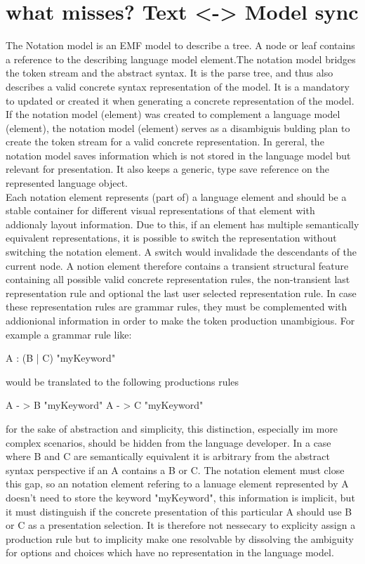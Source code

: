 \section{what misses? Text <-> Model sync}

The Notation model is an EMF model to describe a tree. A node or leaf contains a reference to the describing language model element.The notation model bridges the token stream and the abstract syntax. It is the parse tree, and thus also describes a valid concrete syntax representation of the model.  It is a mandatory to updated or created it when generating a concrete representation of the model. If the notation model (element) was created to complement a language model (element), the notation model (element) serves as a disambiguis bulding plan to create the token stream for a valid concrete representation. In gereral, the notation model saves information which is not stored in the language model but relevant for presentation. It also keeps a generic, type save reference on the represented language object.\\
Each notation element represents (part of) a language element and should be a stable container for different visual representations of that element with addionaly layout information.  Due to this, if an element has multiple semantically equivalent representations, it is possible to switch the representation without switching the notation element. A switch would invalidade the descendants of the current node. A notion element therefore contains a transient structural feature containing all possible valid concrete representation rules, the non-transient last representation rule and optional the last user selected representation rule. In case these representation rules are grammar rules, they must be complemented with addionional information in order to make the token production unambigious. For example a grammar rule like:
\begin{xtxt}
A : (B | C) "myKeyword"
\end{xtxt}
would be translated to the following productions rules 
\begin{xtxt}
A - > B "myKeyword"
A - > C "myKeyword"
\end{xtxt}
for the sake of abstraction and simplicity, this distinction, especially im more complex scenarios, should be hidden from the language developer. In a case where B and C are semantically equivalent  it is arbitrary from the abstract syntax perspective if an A contains a B or C. The notation element must close this gap, so an notation element refering to a lanuage element represented by A doesn't need to store the keyword "myKeyword", this information is implicit, but it must distinguish if the concrete presentation of this particular A should use B or C as a presentation selection. It is therefore not nessecary to explicity assign  a production rule but to implicity make one resolvable by dissolving the ambiguity for options and choices which have no representation in the language model. \\

